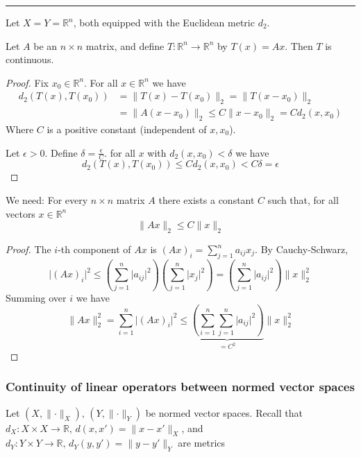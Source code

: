 \documentclass{article}
\begin{document}
\noindent\rule{\textwidth}{0.2pt}

Let $X = Y = \mathbb{R}^{n}$, both equipped with the Euclidean metric $d_{2}$.

Let $A$ be an $n \times n$ matrix, and define $T: \mathbb{R}^{n} \to \mathbb{R}^{n} $ by $T(x) = Ax$. Then $T$ is continuous.

\begin{proof}
    Fix $x_{0}\in \mathbb{R}^{n}$. For all $x\in \mathbb{R}^{n}$ we have
    \begin{align*}
        d_{2}(T(x), T(x_{0})) &= \lVert T(x) - T(x_{0}) \rVert_{2} = \lVert T(x - x_{0}) \rVert_{2}\\
                              &= \lVert A(x - x_{0}) \rVert_{2} \le C\lVert x - x_{0} \rVert_{2} = Cd_{2}(x,x_{0})
    \end{align*}
    Where $C$ is a positive constant (independent of $x,x_{0}$).

    Let $\epsilon > 0$. Define $\delta = \frac{\epsilon}{C}$. for all $x$ with $d_{2}(x,x_{0}) < \delta$ we have
    \[d_{2}(T(x), T(x_{0})) \le Cd_{2}(x,x_{0}) < C\delta = \epsilon\]


\end{proof}

We need: For every $n \times n$ matrix $A$ there exists a constant $C$ such that, for all vectors $x\in \mathbb{R}^{n}$
\[\lVert Ax \rVert_{2} \le C\lVert x \rVert_{2}\]

\begin{proof}
    The $i$-th component of $Ax$ is $(Ax)_{i} = \sum_{j = 1}^{n} a_{ij}x_{j}$. By Cauchy-Schwarz,
    \[\lvert (Ax)_{i} \rvert^{2} \le \left(\sum_{j = 1}^{n} \lvert a_{ij} \rvert^{2}\right) \left(\sum_{j = 1}^{n} \lvert x_{j} \rvert^{2}\right) = \left(\sum_{j = 1}^{n} \lvert a_{ij} \rvert^{2}\right) \lVert  x \rVert^{2}_{2}\]
    Summing over $i$ we have
    \[\lVert Ax \rVert^{2}_{2} = \sum_{i = 1}^{n}\lvert (Ax)_{i} \rvert^{2} \le \underbrace{\left(\sum_{i = 1}^{n}\sum_{j = 1}^{n} \lvert a_{ij} \rvert^{2}\right)}_{= C^{2}} \lVert x \rVert^{2}_{2}\]
\end{proof}

\subsubsection{Continuity of linear operators between normed vector spaces}
Let $(X, \lVert \cdot \rVert_{X}),\,(Y, \lVert \cdot \rVert_{Y})$ be normed vector spaces. Recall that $d_{X} : X \times X \to \mathbb{R},\,d(x, x') = \lVert x - x' \rVert_{X}$, and $d_{Y} : Y \times Y \to \mathbb{R},\, d_{Y}(y, y') = \lVert  y - y' \rVert_{Y}$ are metrics
\end{document}
